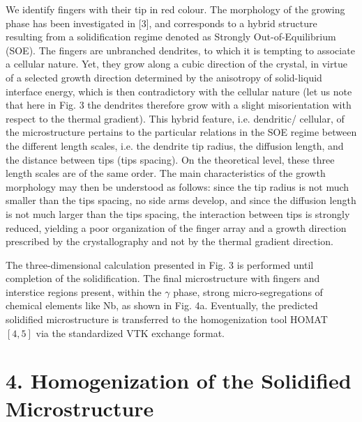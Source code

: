 \documentclass[10pt]{article}
\begin{document}
We identify fingers with their tip in red colour. The morphology of the growing phase has been investigated in [3], and corresponds to a hybrid structure resulting from a solidification regime denoted as Strongly Out-of-Equilibrium (SOE). The fingers are unbranched dendrites, to which it is tempting to associate a cellular nature. Yet, they grow along a cubic direction of the crystal, in virtue of a selected growth direction determined by the anisotropy of solid-liquid interface energy, which is then contradictory with the cellular nature (let us note that here in Fig. 3 the dendrites therefore grow with a slight misorientation with respect to the thermal gradient). This hybrid feature, i.e. dendritic/ cellular, of the microstructure pertains to the particular relations in the SOE regime between the different length scales, i.e. the dendrite tip radius, the diffusion length, and the distance between tips (tips spacing). On the theoretical level, these three length scales are of the same order. The main characteristics of the growth morphology may then be understood as follows: since the tip radius is not much smaller than the tips spacing, no side arms develop, and since the diffusion length is not much larger than the tips spacing, the interaction between tips is strongly reduced, yielding a poor organization of the finger array and a growth direction prescribed by the crystallography and not by the thermal gradient direction.

The three-dimensional calculation presented in Fig. 3 is performed until completion of the solidification. The final microstructure with fingers and interstice regions present, within the $\gamma$ phase, strong micro-segregations of chemical elements like Nb, as shown in Fig. 4a. Eventually, the predicted solidified microstructure is transferred to the homogenization tool HOMAT $[4,5]$ via the standardized VTK exchange format.

\section*{4. Homogenization of the Solidified Microstructure}
\end{document}
